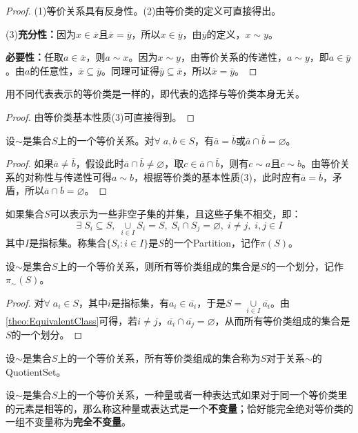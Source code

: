 \begin{proof}
	(1)等价关系具有反身性。(2)由等价类的定义可直接得出。\par
	(3)\textbf{充分性：}因为$x\in\overline{x}$且$\overline{x}=\overline{y}$，所以$x\in\overline{y}$，由$\overline{y}$的定义，$x\sim y$。\par
	\textbf{必要性：}任取$a\in\overline{x}$，则$a\sim x$。因为$x\sim y$，由等价关系的传递性，$a\sim y$，即$a\in\overline{y}$。由$a$的任意性，$\overline{x}\subseteq\overline{y}$。同理可证得$\overline{y}\subseteq\overline{x}$，所以$\overline{x}=\overline{y}$。
\end{proof}
\begin{corollary}
	用不同代表表示的等价类是一样的，即代表的选择与等价类本身无关。
\end{corollary}
\begin{proof}
	由等价类基本性质(3)可直接得到。
\end{proof}
\begin{theorem}\label{theo:EquivalentClass}
	设$\sim$是集合$S$上的一个等价关系。对$\forall\;a,b\in S$，有$\overline{a}=\overline{b}$或$\overline{a}\cap\overline{b}=\varnothing$。
\end{theorem}
\begin{proof}
	如果$\overline{a}\ne\overline{b}$，假设此时$\overline{a}\cap\overline{b}\ne\varnothing$，取$c\in\overline{a}\cap\overline{b}$，则有$c\sim a$且$c\sim b$。由等价关系的对称性与传递性可得$a\sim b$，根据等价类的基本性质(3)，此时应有$\overline{a}=\overline{b}$，矛盾，所以$\overline{a}\cap\overline{b}=\varnothing$。
\end{proof}
\begin{definition}
	如果集合$S$可以表示为一些非空子集的并集，且这些子集不相交，即：
	\begin{equation*}
		\exists\;S_i\subseteq S,\;\underset{i\in I}{\overset{}{\cup}}S_i=S,\;S_i\cap S_j=\varnothing,\;i\ne j,\;i,j\in I
	\end{equation*}
	其中$I$是指标集。称集合$\{S_i:i\in I\}$是$S$的一个\gls{Partition}，记作$\pi(S)$。
\end{definition}
\begin{theorem}
	设$\sim$是集合$S$上的一个等价关系，则所有等价类组成的集合是$S$的一个划分，记作$\pi_\sim(S)$。
\end{theorem}
\begin{proof}
	对$\forall\;a_i\in S$，其中$i$是指标集，有$a_i\in\overline{a_i}$，于是$S=\underset{i\in I}{\overset{}{\cup}}\overline{a_i}$。由\cref{theo:EquivalentClass}可得，若$i\ne j$，$\overline{a_i}\cap\overline{a_j}=\varnothing$，从而所有等价类组成的集合是$S$的一个划分。
\end{proof}
\begin{definition}
	设$\sim$是集合$S$上的一个等价关系，所有等价类组成的集合称为$S$对于关系$\sim$的\gls{QuotientSet}。
\end{definition}
\begin{definition}
	设$\sim$是集合$S$上的一个等价关系，一种量或者一种表达式如果对于同一个等价类里的元素是相等的，那么称这种量或表达式是一个\textbf{不变量}；恰好能完全绝对等价类的一组不变量称为\textbf{完全不变量}。
\end{definition}











